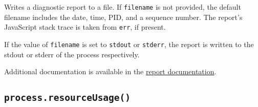 Writes a diagnostic report to a file. If \texttt{filename} is not
provided, the default filename includes the date, time, PID, and a
sequence number. The report's JavaScript stack trace is taken from
\texttt{err}, if present.

If the value of \texttt{filename} is set to
\texttt{\textquotesingle{}stdout\textquotesingle{}} or
\texttt{\textquotesingle{}stderr\textquotesingle{}}, the report is
written to the stdout or stderr of the process respectively.

\begin{Shaded}
\begin{Highlighting}[]
 \OperatorTok{;}

\NormalTok{()}\OperatorTok{;}
\end{Highlighting}
\end{Shaded}

\begin{Shaded}
\begin{Highlighting}[]
\OperatorTok{=} \NormalTok{(}\NormalTok{)}\OperatorTok{;}

\NormalTok{()}\OperatorTok{;}
\end{Highlighting}
\end{Shaded}

Additional documentation is available in the \href{report.md}{report
documentation}.

\subsection{\texorpdfstring{\texttt{process.resourceUsage()}}{process.resourceUsage()}}\label{process.resourceusage}

